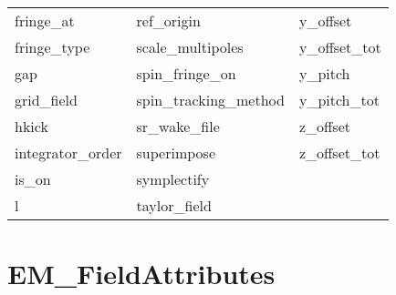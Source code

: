 \begin{tabular}{lll}
fringe_at                   & ref_origin                  & y_offset                    \\
fringe_type                 & scale_multipoles            & y_offset_tot                \\
gap                         & spin_fringe_on              & y_pitch                     \\
grid_field                  & spin_tracking_method        & y_pitch_tot                 \\
hkick                       & sr_wake_file                & z_offset                    \\
integrator_order            & superimpose                 & z_offset_tot                \\
is_on                       & symplectify                 &                             \\
l                           & taylor_field                &                             \\
 \bottomrule
 \end{tabular}
 \vfill
 
 \section{EM_FieldAttributes}
 \label{s:list.em.field}
 
